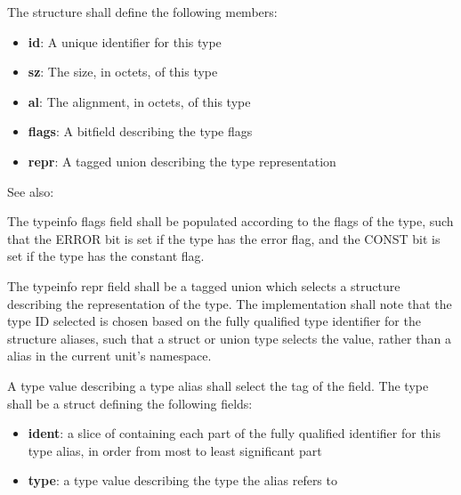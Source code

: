 
\specsubsubitem
The  structure shall define the following members:

\begin{itemize}
\item \textbf{id}: A unique identifier for this type
\item \textbf{sz}: The size, in octets, of this type
\item \textbf{al}: The alignment, in octets, of this type
\item \textbf{flags}: A bitfield describing the type flags
\item \textbf{repr}: A tagged union describing the type representation
\end{itemize}

See also: 


\specsubsubitem
The typeinfo flags field shall be populated according to the flags of the type,
such that the ERROR bit is set if the type has the error flag, and the CONST
bit is set if the type has the constant flag.


\specsubsubitem
The typeinfo repr field shall be a tagged union which selects a structure
describing the representation of the type. The implementation shall note that
the type ID selected is chosen based on the fully qualified type identifier for
the structure aliases, such that a struct or union type selects the
 value, rather than a  alias in the
current unit's namespace.


\specsubsubitem
A type value describing a type alias shall select the  tag
of the  field. The  type shall be
a struct defining the following fields:

\begin{itemize}
\item \textbf{ident}: a slice of  containing each part of the
fully qualified identifier for this type alias, in order from most to least
significant part
\item \textbf{type}: a type value describing the type the alias refers to
\end{itemize}


